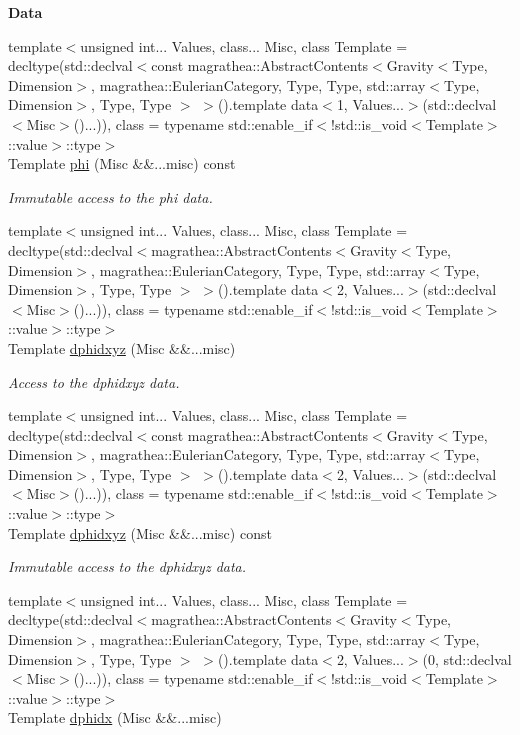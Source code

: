 \begin{Indent}{\bf Data}
\begin{DoxyCompactItemize}
{\footnotesize template$<$unsigned int... Values, class... Misc, class Template  = decltype(std\-::declval$<$const magrathea\-::\-Abstract\-Contents$<$\-Gravity$<$\-Type, Dimension$>$, magrathea\-::\-Eulerian\-Category, Type, Type, std\-::array$<$\-Type, Dimension$>$, Type, Type $>$ $>$().\-template data$<$1, Values...$>$(std\-::declval$<$\-Misc$>$()...)), class  = typename std\-::enable\-\_\-if$<$!std\-::is\-\_\-void$<$\-Template$>$\-::value$>$\-::type$>$ }\\Template \hyperlink{exceptionGravity_a7d1bd776916ad1a88a0e2470d0e5b5e2}{phi} (Misc \&\&...misc) const 
\begin{DoxyCompactList}\small\item\em Immutable access to the phi data. \end{DoxyCompactList}\item 
{\footnotesize template$<$unsigned int... Values, class... Misc, class Template  = decltype(std\-::declval$<$magrathea\-::\-Abstract\-Contents$<$\-Gravity$<$\-Type, Dimension$>$, magrathea\-::\-Eulerian\-Category, Type, Type, std\-::array$<$\-Type, Dimension$>$, Type, Type $>$ $>$().\-template data$<$2, Values...$>$(std\-::declval$<$\-Misc$>$()...)), class  = typename std\-::enable\-\_\-if$<$!std\-::is\-\_\-void$<$\-Template$>$\-::value$>$\-::type$>$ }\\Template \hyperlink{exceptionGravity_a28b74bae68bdd45514753c8b3779f90c}{dphidxyz} (Misc \&\&...misc)
\begin{DoxyCompactList}\small\item\em Access to the dphidxyz data. \end{DoxyCompactList}\item 
{\footnotesize template$<$unsigned int... Values, class... Misc, class Template  = decltype(std\-::declval$<$const magrathea\-::\-Abstract\-Contents$<$\-Gravity$<$\-Type, Dimension$>$, magrathea\-::\-Eulerian\-Category, Type, Type, std\-::array$<$\-Type, Dimension$>$, Type, Type $>$ $>$().\-template data$<$2, Values...$>$(std\-::declval$<$\-Misc$>$()...)), class  = typename std\-::enable\-\_\-if$<$!std\-::is\-\_\-void$<$\-Template$>$\-::value$>$\-::type$>$ }\\Template \hyperlink{exceptionGravity_a4f11fec6ecaff1b01821890457e66bd9}{dphidxyz} (Misc \&\&...misc) const 
\begin{DoxyCompactList}\small\item\em Immutable access to the dphidxyz data. \end{DoxyCompactList}\item 
{\footnotesize template$<$unsigned int... Values, class... Misc, class Template  = decltype(std\-::declval$<$magrathea\-::\-Abstract\-Contents$<$\-Gravity$<$\-Type, Dimension$>$, magrathea\-::\-Eulerian\-Category, Type, Type, std\-::array$<$\-Type, Dimension$>$, Type, Type $>$ $>$().\-template data$<$2, Values...$>$(0, std\-::declval$<$\-Misc$>$()...)), class  = typename std\-::enable\-\_\-if$<$!std\-::is\-\_\-void$<$\-Template$>$\-::value$>$\-::type$>$ }\\Template \hyperlink{exceptionGravity_a6c79d0fee6ef4d993d4a15eab5c04fd8}{dphidx} (Misc \&\&...misc)

\end{DoxyCompactItemize}
\end{Indent}
